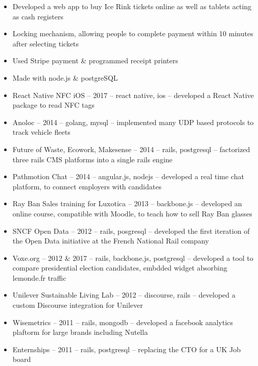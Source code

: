 \documentclass[10pt,a4paper,ragged2e,withhyper]{altacv}
\begin{document}
\begin{paracol}{2}
\divider

\begin{itemize}
  \item Developed a web app to buy Ice Rink tickets online as well as tablets acting as cash registers
  \item Locking mechanism, allowing people to complete payment within 10 minutes after selecting tickets
  \item Used Stripe payment \& programmed receipt printers
  \item Made with node.js \& postgreSQL
\end{itemize}

\divider

\begin{itemize}
  \item React Native NFC iOS -- 2017 -- react native, ios -- developed a React Native package to read NFC tags
  \item Anoloc -- 2014 -- golang, mysql -- implemented many UDP based protocols to track vehicle fleets
  \item Future of Waste, Ecowork, Makesense -- 2014 -- rails, postgresql -- factorized three rails CMS platforms into a single rails engine
  \item Pathmotion Chat -- 2014 -- angular.js, nodejs -- developed a real time chat platform, to connect employers with candidates
  \item Ray Ban Sales training for Luxotica -- 2013 -- backbone.js -- developed an online course, compatible with Moodle, to teach how to sell Ray Ban glasses
  \item SNCF Open Data -- 2012 -- rails, posgresql -- developed the first iteration of the Open Data initiative at the French National Rail company
  \item Voxe.org -- 2012 \& 2017 -- rails, backbone.js, postgresql  -- developed a tool to compare presidential election candidates, embdded widget absorbing lemonde.fr traffic
  \item Unilever Sustainable Living Lab -- 2012 -- discourse, rails -- developed a custom Discourse integration for Unilever
  \item Wisemetrics -- 2011 -- rails, mongodb -- developed a facebook analytics plaftorm for large brands including Nutella
  \item Enternships -- 2011 -- rails, postgresql -- replacing the CTO for a UK Job board
\end{itemize}



\end{paracol}
\end{document}
